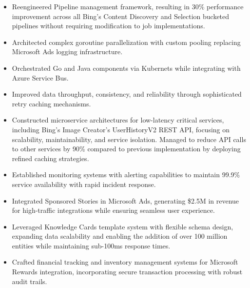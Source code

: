 \begin{itemize}
    \item \small{Reengineered Pipeline management framework, resulting in 30\% performance
        improvement across all Bing's Content Discovery and Selection bucketed pipelines without
        requiring modification to job implementations.}

    \item \small{Architected complex goroutine parallelization with custom pooling replacing Microsoft
        Ads logging infrastructure.}
        
    \item \small{Orchestrated Go and Java components via Kubernets while integrating with Azure Service Bus.}
    
    \item \small{Improved data throughput, consistency, and reliability through sophisticated retry caching mechanisms.}
    
    \item \small{Constructed microservice architectures for low-latency critical services, 
        including Bing's Image Creator's UserHistoryV2 REST API, focusing on scalability,
        maintainability, and service isolation. Managed to reduce API calls to other services by 90\%
        compared to previous implementation by deploying refined caching strategies.}
    
    \item \small{Established monitoring systems with alerting capabilities to maintain 99.9\%
        service availability with rapid incident response.}


    \item \small{Integrated Sponsored Stories in Microsoft Ads, generating \$2.5M in revenue for
        high-traﬀic integrations while ensuring seamless user experience.}

    \item \small{Leveraged Knowledge Cards template system with flexible schema design, expanding
        data scalability and enabling the addition of over 100 million entities while maintaining
        sub-100ms response times.}

    \item \small{Crafted financial tracking and inventory management systems for Microsoft Rewards
        integration, incorporating secure transaction processing with robust audit trails.}

\end{itemize}